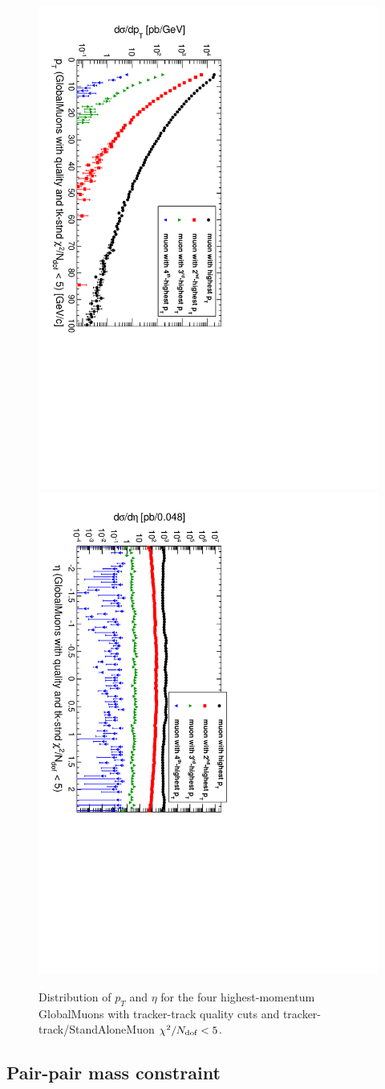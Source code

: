 \documentclass[12pt]{article}
\newcommand{\s}[1]{{\mbox{\scriptsize #1}}}
\begin{document}
\begin{figure}
\includegraphics[height=0.5\linewidth, angle=90]{fig/backgroundsMatching_plot/ptcurves_GlobalMuonsGoodTrackerMatch.pdf}
\includegraphics[height=0.5\linewidth, angle=90]{fig/backgroundsMatching_plot/etacurves_GlobalMuonsGoodTrackerMatch.pdf}

\caption{Distribution of $p_T$ and $\eta$ for the four highest-momentum GlobalMuons with tracker-track quality cuts and tracker-track/StandAloneMuon $\chi^2/N_\s{dof} < 5$. \label{fig:curves_GlobalMuonsGoodTrackerMatch}}
\end{figure}

\subsection{Pair-pair mass constraint}
\end{document}
